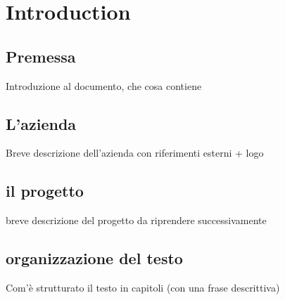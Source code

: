 \chapter{Introduction}
\label{introduction}

\section{Premessa}
Introduzione al documento, che cosa contiene

\section{L'azienda}
Breve descrizione dell'azienda con riferimenti esterni + logo

\section{il progetto}
breve descrizione del progetto da riprendere successivamente

\section{organizzazione del testo}
Com'è strutturato il testo in capitoli (con una frase descrittiva)